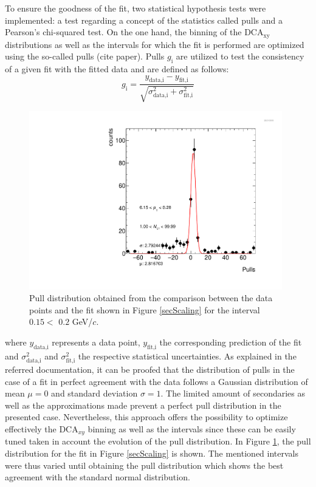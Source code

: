 \documentclass[12pt,a4paper]{report}
\begin{document}
To ensure the goodness of the fit, two statistical hypothesis tests were implemented: a test regarding a concept of the statistics called pulls and a Pearson's chi-squared test. On the one hand, the binning of the DCA$_{\text{xy}}$ distributions as well as the \pt intervals for which the fit is performed are optimized using the so-called pulls (cite paper). Pulls $g_\text{i}$ are utilized to test the consistency of a given fit with the fitted data and are defined as follows:
\begin{equation}
g_\text{i} = \dfrac{y_\text{data,i} - y_\text{fit,i}}{\sqrt{\sigma_\text{data,i}^2+\sigma_\text{fit,i}^2}}
\end{equation}
\begin{figure}[tb!]
\centering
\includegraphics[width=11cm]{Plots/Pulls_Pt0_Mult0.pdf}  
\caption{Pull distribution obtained from the comparison between the data points and the fit shown in Figure \ref{secScaling} for the \pt interval $0.15 <$ \pt $0.2$ GeV/$c$.}
\label{Pulls}
\end{figure}
where $y_\text{data,i}$ represents a data point, $y_\text{fit,i}$ the corresponding prediction of the fit and $\sigma_\text{data,i}^2$ and $\sigma_\text{fit,i}^2$ the respective statistical uncertainties. As explained in the referred documentation, it can be proofed that the distribution of pulls in the case of a fit in perfect agreement with the data follows a Gaussian distribution of mean $\mu = 0$ and standard deviation $\sigma = 1$. The limited amount of secondaries as well as the approximations made prevent a perfect pull distribution in the presented case. Nevertheless, this approach offers the possibility to optimize effectively the $\text{DCA}_{xy}$ binning as well as the \pt intervals since these can be easily tuned taken in account the evolution of the pull distribution. In Figure \ref{Pulls}, the pull distribution for the fit in Figure \ref{secScaling} is shown. The mentioned intervals were thus varied until obtaining the pull distribution which shows the best agreement with the standard normal distribution.\\
\end{document}
